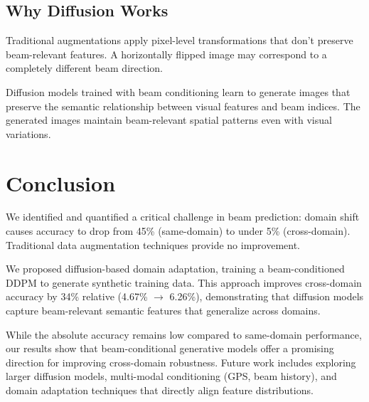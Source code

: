 \documentclass[conference]{IEEEtran}
\begin{document}
\subsection{Why Diffusion Works}

Traditional augmentations apply pixel-level transformations that don't preserve beam-relevant features. A horizontally flipped image may correspond to a completely different beam direction.

Diffusion models trained with beam conditioning learn to generate images that preserve the semantic relationship between visual features and beam indices. The generated images maintain beam-relevant spatial patterns even with visual variations.

\section{Conclusion}

We identified and quantified a critical challenge in beam prediction: domain shift causes accuracy to drop from 45\% (same-domain) to under 5\% (cross-domain). Traditional data augmentation techniques provide no improvement.

We proposed diffusion-based domain adaptation, training a beam-conditioned DDPM to generate synthetic training data. This approach improves cross-domain accuracy by 34\% relative (4.67\% $\to$ 6.26\%), demonstrating that diffusion models capture beam-relevant semantic features that generalize across domains.

While the absolute accuracy remains low compared to same-domain performance, our results show that beam-conditional generative models offer a promising direction for improving cross-domain robustness. Future work includes exploring larger diffusion models, multi-modal conditioning (GPS, beam history), and domain adaptation techniques that directly align feature distributions.



\end{document}
